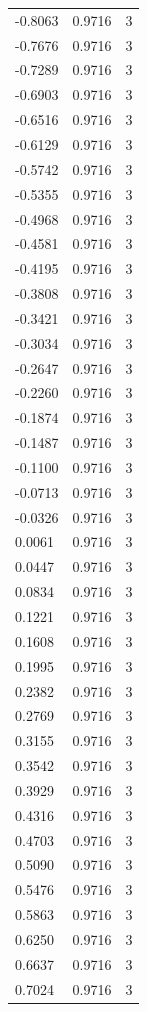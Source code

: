 \begin{longtable}{lrr}
  -0.8063 & 0.9716 & 3 \\
  -0.7676 & 0.9716 & 3 \\
  -0.7289 & 0.9716 & 3 \\
  -0.6903 & 0.9716 & 3 \\
  -0.6516 & 0.9716 & 3 \\
  -0.6129 & 0.9716 & 3 \\
  -0.5742 & 0.9716 & 3 \\
  -0.5355 & 0.9716 & 3 \\
  -0.4968 & 0.9716 & 3 \\
  -0.4581 & 0.9716 & 3 \\
  -0.4195 & 0.9716 & 3 \\
  -0.3808 & 0.9716 & 3 \\
  -0.3421 & 0.9716 & 3 \\
  -0.3034 & 0.9716 & 3 \\
  -0.2647 & 0.9716 & 3 \\
  -0.2260 & 0.9716 & 3 \\
  -0.1874 & 0.9716 & 3 \\
  -0.1487 & 0.9716 & 3 \\
  -0.1100 & 0.9716 & 3 \\
  -0.0713 & 0.9716 & 3 \\
  -0.0326 & 0.9716 & 3 \\
  0.0061 & 0.9716 & 3 \\
  0.0447 & 0.9716 & 3 \\
  0.0834 & 0.9716 & 3 \\
  0.1221 & 0.9716 & 3 \\
  0.1608 & 0.9716 & 3 \\
  0.1995 & 0.9716 & 3 \\
  0.2382 & 0.9716 & 3 \\
  0.2769 & 0.9716 & 3 \\
  0.3155 & 0.9716 & 3 \\
  0.3542 & 0.9716 & 3 \\
  0.3929 & 0.9716 & 3 \\
  0.4316 & 0.9716 & 3 \\
  0.4703 & 0.9716 & 3 \\
  0.5090 & 0.9716 & 3 \\
  0.5476 & 0.9716 & 3 \\
  0.5863 & 0.9716 & 3 \\
  0.6250 & 0.9716 & 3 \\
  0.6637 & 0.9716 & 3 \\
  0.7024 & 0.9716 & 3 \\

\end{longtable}
